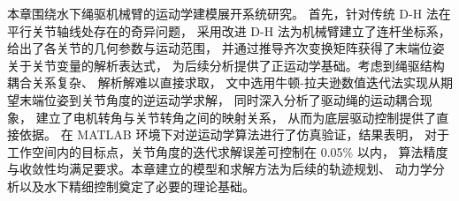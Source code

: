 本章围绕水下绳驱机械臂的运动学建模展开系统研究。
首先，针对传统 D-H 法在平行关节轴线处存在的奇异问题，
采用改进 D-H 法为机械臂建立了连杆坐标系，给出了各关节的几何参数与运动范围，
并通过推导齐次变换矩阵获得了末端位姿关于关节变量的解析表达式，
为后续分析提供了正运动学基础。考虑到绳驱结构耦合关系复杂、
解析解难以直接求取，
文中选用牛顿-拉夫逊数值迭代法实现从期望末端位姿到关节角度的逆运动学求解，
同时深入分析了驱动绳的运动耦合现象，
建立了电机转角与关节转角之间的映射关系，
从而为底层驱动控制提供了直接依据。
在 MATLAB 环境下对逆运动学算法进行了仿真验证，结果表明，
对于工作空间内的目标点，关节角度的迭代求解误差可控制在 0.05\% 以内，
算法精度与收敛性均满足要求。本章建立的模型和求解方法为后续的轨迹规划、
动力学分析以及水下精细控制奠定了必要的理论基础。
\clearpage{
    \pagestyle{plain}
    \cleardoublepage
  }